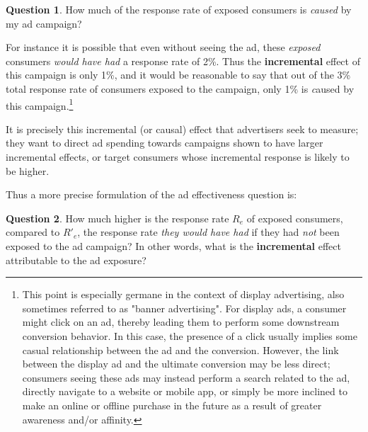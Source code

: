 \documentclass[11pt,a4paper]{article}
\theoremstyle{definition}
\theoremstyle{remark}
\theoremstyle{definition}
\theoremstyle{definition}
\theoremstyle{definition}
\newtheorem{question}{Question}[section]
\theoremstyle{definition}
\theoremstyle{definition}
\theoremstyle{definition}
\begin{document}
\begin{question}
	How much of the response rate of exposed consumers is  \textit{caused} by my ad campaign? 
\end{question}


For instance it is possible that even without seeing the ad, these {\em exposed} consumers {\em would have had} a response rate of 2\%. Thus the {\bf incremental} effect of this campaign is only 1\%, and it would be reasonable to say that out of the 3\% total response rate of consumers exposed to the campaign, only 1\% is {\emph caused} by this campaign.\footnote{This point is especially germane in the context of display advertising, also sometimes referred to as "banner advertising". For display ads, a consumer might click on an ad, thereby leading them to perform some downstream conversion behavior. In this case, the presence of a click usually implies some casual relationship between the ad and the conversion. However, the link between the display ad and the ultimate conversion may be less direct; consumers seeing these ads may instead perform a search related to the ad, directly navigate to a website or mobile app, or simply be more inclined to make an online or offline purchase in the future as a result of greater awareness and/or affinity.}

It is precisely this incremental (or causal) effect that advertisers seek to measure; they want to direct ad spending towards  campaigns shown to have larger incremental effects, or target consumers whose incremental response is likely to be higher.

Thus a more precise formulation of the ad effectiveness question is:
\begin{question} \label{q-incr}
	How much higher is the response rate $R_e$ of exposed consumers, compared to $R'_e$, the response rate {\em they would have had} if they had {\em not} been exposed to the ad campaign? In other words, what is the \textbf{incremental} effect attributable to the ad exposure?
\end{question}
\end{document}
